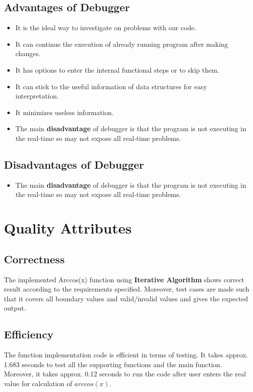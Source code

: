 \documentclass[11pt]{article}
\begin{document}
\subsection{Advantages of Debugger }
\begin{itemize}
\item It is the ideal way to investigate on problems with our code. 
\item It can continue the execution of already running program after making changes.
\item It has options to enter the internal functional steps or to skip them. 
\item It can stick to the useful information of data structures for easy interpretation.
\item It minimizes useless information.
\item The main \textbf{disadvantage} of debugger is that the program is not executing in the real-time so may not expose all real-time problems.
\end{itemize} 
\subsection{Disadvantages of Debugger}
\begin{itemize}
\item The main \textbf{disadvantage} of debugger is that the program is not executing in the real-time so may not expose all real-time problems.
\end{itemize} 
\section{Quality Attributes}
\subsection{Correctness}
The implemented Arccos(x) function using \textbf{Iterative Algorithm} shows correct result according to the requirements specified. Moreover, test cases are made such that it covers all boundary values and valid/invalid values and gives the expected output.
\subsection{Efficiency}
The function implementation code is efficient in terms of testing. It takes approx. 1.683 seconds to test all the supporting functions and the main function. Moreover, it takes approx. 0.12 seconds to run the code after user enters the real value for calculation of $arccos(x)$.
\end{document}
